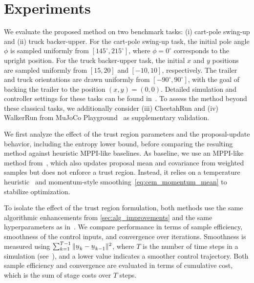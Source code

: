 \section{Experiments}
\label{sec:eval}

We evaluate the proposed method on two benchmark tasks: (i) cart-pole swing-up and (ii) truck backer-upper.
For the cart-pole swing-up task, the initial pole angle $\phi$ is sampled uniformly from $[145^\circ, 215^\circ]$, where $\phi = 0^\circ$ corresponds to the upright position.
For the truck backer-upper task, the initial $x$ and $y$ positions are sampled uniformly from $[15, 20]$ and $[-10, 10]$, respectively. The trailer and truck orientations are drawn uniformly from $[-90^\circ, 90^\circ]$, with the goal of backing the trailer to the position $(x,y)=(0,0)$.
Detailed simulation and controller settings for these tasks can be found in~\cite{arXiv26_Walker_IFAC,walkerSampleefficientSmoothCrossentropy2026}.
To assess the method beyond these classical tasks, we additionally consider (iii) CheetahRun and (iv) WalkerRun from MuJoCo Playground~\cite{zakkaDemonstratingMuJoCoPlayground2025} as supplementary validation.

We first analyze the effect of the trust region parameters and the proposal-update behavior, including the entropy lower bound, before comparing the resulting method against heuristic \ac{MPPI}-like baselines.
As baseline, we use an \ac{MPPI}-like method from~\cite{arXiv26_Walker_IFAC}, which also updates proposal mean and covariance from weighted samples but does not enforce a trust region. Instead, it relies on a temperature heuristic~\cite{pezzatoSamplingbasedModelPredictive2025} and momentum-style smoothing~\cref{eq:cem_momentum_mean} to stabilize optimization.

To isolate the effect of the trust region formulation, both methods use the same algorithmic enhancements from \cref{sec:alg_improvements} and the same hyperparameters as in~\cite{arXiv26_Walker_IFAC}.
We compare performance in terms of sample efficiency, smoothness of the control inputs, and convergence over iterations.
Smoothness is measured using $\sum_{k=1}^{T-1} \| \vu_{k} - \vu_{k-1} \|^2 $, where $T$ is the number of time steps in a simulation (see~\cite{arXiv26_Walker_IFAC}), and a lower value indicates a smoother control trajectory.
Both sample efficiency and convergence are evaluated in terms of cumulative cost, which is the sum of stage costs over $T$ steps.

